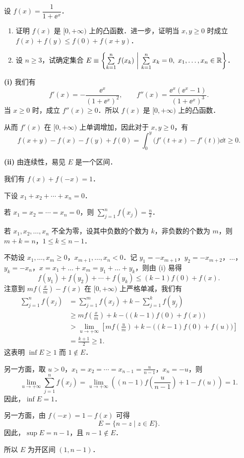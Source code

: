 设 $f(x)=\dfrac{1}{1+\ee^{x}}$．
\begin{enumerate}[label=(\roman*)]
  \item 证明 $f(x)$ 是 $[0,+\infty)$ 上的凸函数．进一步，证明当 $x,y\ge0$ 时成立 $f(x)+f(y)\le f(0)+f(x+y)$．
  \item 设 $n\ge3$，试确定集合 $E\equiv\left\{\sum\limits_{k=1}^{n}f(x_k)\ \middle|\ \sum\limits_{k=1}^{n}x_k=0,\ x_1,\dots,x_n\in\R\right\}$．
\end{enumerate}

\begin{solution}
\textbf{(i)} 我们有
\[
  f'(x)=-\frac{\ee^{x}}{(1+\ee^{x})^{2}},\qquad
  f''(x)=\frac{\ee^{x}(\ee^{x}-1)}{(1+\ee^{x})^{3}}.
\]
当 $x\ge0$ 时，成立 $f''(x)\ge0$．所以 $f(x)$ 是 $[0,+\infty)$ 上的凸函数．

从而 $f'(x)$ 在 $[0,+\infty)$ 上单调增加，因此对于 $x,y\ge0$，有
\[
  f(x+y)-f(x)-f(y)+f(0)=\int_0^y\bigl(f'(t+x)-f'(t)\bigr)\dd t\ge0.
\]

\textbf{(ii)} 由连续性，易见 $E$ 是一个区间．

我们有 $f(x)+f(-x)=1$．

下设 $x_1+x_2+\cdots+x_n=0$．

若 $x_1=x_2=\cdots=x_n=0$，则 $\sum\limits_{j=1}^{n}f(x_j)=\frac n2$．

若 $x_1,x_2,\dots,x_n$ 不全为零，设其中负数的个数为 $k$，非负数的个数为 $m$，则 $m+k=n$，$1\le k\le n-1$．

不妨设 $x_1,\dots,x_m\ge0$，$x_{m+1},\dots,x_n<0$．记 $y_1=-x_{m+1}$，$y_2=-x_{m+2}$，$\dots$，$y_k=-x_n$，$x=x_1+\dots+x_m=y_1+\dots+y_k$，则由 (i) 易得
\[
  f(y_1)+f(y_2)+\cdots+f(y_k)\le(k-1)f(0)+f(x).
\]
注意到 $mf\left(\frac xm\right)-f(x)$ 在 $[0,+\infty)$ 上严格单减，我们有
\begin{align*}
  \sum_{j=1}^{n}f(x_j)
  &=\sum_{j=1}^{m}f(x_j)+k-\sum_{j=1}^{k}f(y_j)\\
  &\ge mf\left(\frac xm\right)+k-\bigl((k-1)f(0)+f(x)\bigr)\\
  &>\lim_{u\to+\infty}\left[mf\left(\frac um\right)+k-\bigl((k-1)f(0)+f(u)\bigr)\right]\\
  &=\frac{k+1}{2}\ge1.
\end{align*}
这表明 $\inf E\ge1$ 而 $1\notin E$．

另一方面，取 $u>0$，$x_1=x_2=\cdots=x_{n-1}=\frac{u}{n-1}$，$x_n=-u$，则
\[
  \lim_{u\to+\infty}\sum_{j=1}^{n}f(x_j)
  =\lim_{u\to+\infty}\left((n-1)f\left(\frac{u}{n-1}\right)+1-f(u)\right)=1.
\]
因此，$\inf E=1$．

另一方面，由 $f(-x)=1-f(x)$ 可得
\[
  E=\{n-z\mid z\in E\}.
\]
因此，$\sup E=n-1$，且 $n-1\notin E$．

所以 $E$ 为开区间 $(1,n-1)$．
\end{solution}
